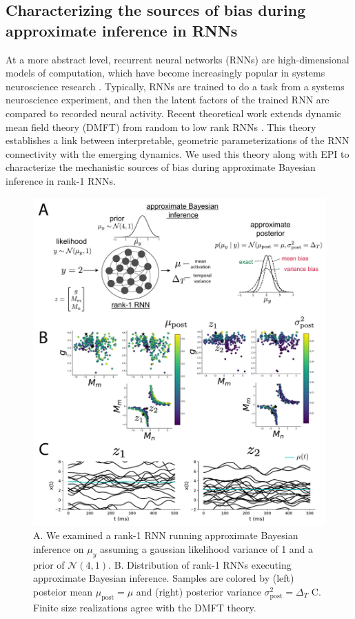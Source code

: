 \documentclass[11pt]{article}
\begin{document}
\subsection{Characterizing the sources of bias during approximate inference in RNNs}
At a more abstract level, recurrent neural networks (RNNs) are high-dimensional models of computation, which have become increasingly popular in systems neuroscience research \cite{barak2017recurrent}. 
Typically, RNNs are trained to do a task from a systems neuroscience experiment, and then the latent factors of the trained RNN are compared to recorded neural activity.  
Recent theoretical work extends dynamic mean field theory (DMFT) from random \cite{sompolinsky1988chaos} to low rank RNNs \cite{mastrogiuseppe2018linking}.
This theory establishes a link between interpretable, geometric parameterizations of the RNN connectivity with the emerging dynamics.  We used this theory along with EPI to characterize the mechanistic sources of bias during approximate Bayesian inference in rank-1 RNNs.

\begin{figure}
\begin{center}
\includegraphics[scale=0.7]{figs/fig5/fig5.pdf}
\end{center}
\caption{A. We examined a rank-1 RNN running approximate Bayesian inference on $\mu_y$ assuming a gaussian likelihood variance of 1 and a prior of $\mathcal{N}(4,1)$.  B. Distribution of rank-1 RNNs executing approximate Bayesian inference.  Samples are colored by (left) posteior mean $\mu_{\text{post}}=\mu$ and (right) posterior variance $\sigma^2_{\text{post}}=\Delta_T$  C. Finite size realizations agree with the DMFT theory.}
\end{figure}
\end{document}
